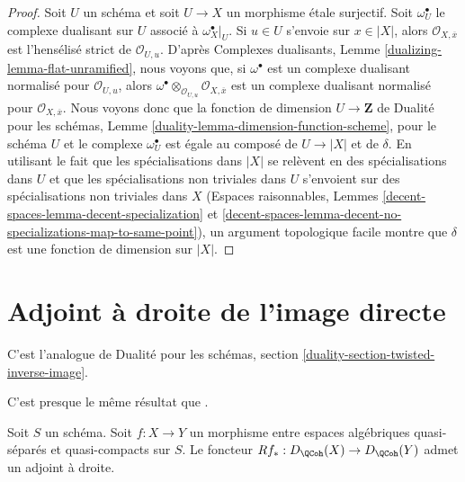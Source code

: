 \begin{proof}
Soit $U$ un schéma et soit $U \to X$ un morphisme \'etale surjectif.
Soit $\omega_U^\bullet$ le complexe dualisant sur $U$ associé
à $\omega_X^\bullet|_U$.
Si $u \in U$ s'envoie sur $x \in |X|$, alors $\mathcal{O}_{X, \overline{x}}$
est l'hensélisé strict de $\mathcal{O}_{U, u}$. D'après
Complexes dualisants, Lemme \ref{dualizing-lemma-flat-unramified},
nous voyons que, si $\omega^\bullet$ est un complexe dualisant normalisé
pour $\mathcal{O}_{U, u}$, alors
$\omega^\bullet \otimes_{\mathcal{O}_{U, u}} \mathcal{O}_{X, \overline{x}}$
est un complexe dualisant normalisé pour $\mathcal{O}_{X, \overline{x}}$.
Nous voyons donc que la fonction de dimension $U \to \mathbf{Z}$ de
Dualité pour les schémas, Lemme \ref{duality-lemma-dimension-function-scheme},
pour le schéma $U$ et le complexe
$\omega_U^\bullet$ est égale au composé de $U \to |X|$ et de $\delta$.
En utilisant le fait que les spécialisations dans $|X|$ se relèvent en des spécialisations dans $U$
et que les spécialisations non triviales dans $U$ s'envoient sur des
spécialisations non triviales dans $X$
(Espaces raisonnables, Lemmes \ref{decent-spaces-lemma-decent-specialization} et
\ref{decent-spaces-lemma-decent-no-specializations-map-to-same-point}),
un argument topologique facile montre que $\delta$ est une fonction de dimension
sur $|X|$.
\end{proof}




 
\section{Adjoint à droite de l'image directe}
\label{section-twisted-inverse-image}

\noindent
C'est l'analogue de Dualité pour les schémas, section
\ref{duality-section-twisted-inverse-image}.

\begin{lemma}
\label{lemma-twisted-inverse-image}
\begin{reference}
C'est presque le même résultat que \cite[exemple 4.2]{Neeman-Grothendieck}.
\end{reference}
Soit $S$ un schéma.
Soit $f : X \to Y$ un morphisme entre espaces algébriques quasi-séparés et quasi-compacts
sur $S$. Le foncteur $Rf_* : D_\QCoh(X) \to D_\QCoh(Y)$
admet un adjoint à droite.
\end{lemma}

